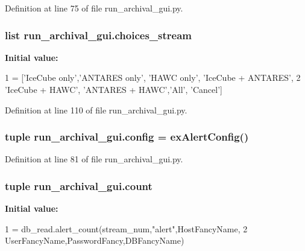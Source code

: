 Definition at line 75 of file run\-\_\-archival\-\_\-gui.\-py.

\hypertarget{namespacerun__archival__gui_ae5a341b12805f049c64adaa23e98c3ab}{
\subsubsection[{choices\-\_\-stream}]{\setlength{\rightskip}{0pt plus 5cm}list run\-\_\-archival\-\_\-gui.\-choices\-\_\-stream}}\label{namespacerun__archival__gui_ae5a341b12805f049c64adaa23e98c3ab}
{\bfseries Initial value\-:}
\begin{DoxyCode}
1 = [\textcolor{stringliteral}{'IceCube only'},\textcolor{stringliteral}{'ANTARES only'}, \textcolor{stringliteral}{'HAWC only'}, \textcolor{stringliteral}{'IceCube + ANTARES'},
2                     \textcolor{stringliteral}{'IceCube + HAWC'}, \textcolor{stringliteral}{'ANTARES + HAWC'},\textcolor{stringliteral}{'All'}, \textcolor{stringliteral}{'Cancel'}]
\end{DoxyCode}


Definition at line 110 of file run\-\_\-archival\-\_\-gui.\-py.

\hypertarget{namespacerun__archival__gui_a1d8fd345205ef225bd22809ef7491177}{
\subsubsection[{config}]{\setlength{\rightskip}{0pt plus 5cm}tuple run\-\_\-archival\-\_\-gui.\-config = ex\-Alert\-Config()}}\label{namespacerun__archival__gui_a1d8fd345205ef225bd22809ef7491177}


Definition at line 81 of file run\-\_\-archival\-\_\-gui.\-py.

\hypertarget{namespacerun__archival__gui_aa8935b1559e71c8b6fb48106b2129880}{
\subsubsection[{count}]{\setlength{\rightskip}{0pt plus 5cm}tuple run\-\_\-archival\-\_\-gui.\-count}}\label{namespacerun__archival__gui_aa8935b1559e71c8b6fb48106b2129880}
{\bfseries Initial value\-:}
\begin{DoxyCode}
1 = db\_read.alert\_count(stream\_num,\textcolor{stringliteral}{"alert"},HostFancyName,
2                            UserFancyName,PasswordFancy,DBFancyName)
\end{DoxyCode}


